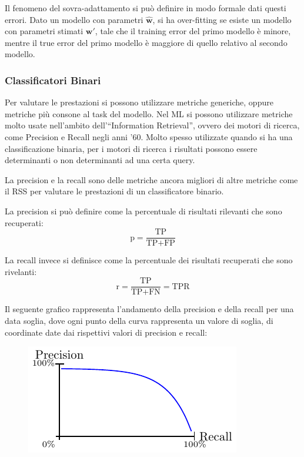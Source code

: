 \documentclass{article}
\numberwithin{equation}{subsection}
\newcommand{\vect}[1]{\boldsymbol{\mathbf{#1}}}
\begin{document}
Il fenomeno del sovra-adattamento si può definire in modo formale dati questi errori. 
Dato un modello con parametri $\vect{\hat{w}}$, si ha over-fitting se esiste un modello con 
parametri stimati $\vect{w}'$, tale che il training error del primo modello è 
minore, mentre il true error del primo modello è maggiore di quello relativo al secondo 
modello. 

\subsubsection{Classificatori Binari}

Per valutare le prestazioni si possono utilizzare metriche generiche, oppure metriche più 
consone al task del modello. Nel ML si possono utilizzare metriche molto usate nell'ambito dell'``Information Retrieval'', ovvero dei motori di ricerca, come Precision e Recall negli anni '60. 
Molto spesso utilizzate quando si ha una classificazione binaria, per i motori di ricerca i risultati possono essere determinanti o non determinanti ad una certa query. 

La precision e la recall sono delle metriche ancora migliori di altre metriche come il RSS per valutare le prestazioni di un classificatore binario. 

La precision si può definire come la percentuale di risultati rilevanti che sono 
recuperati:
\begin{equation}
    \text{p}=\displaystyle\frac{\text{TP}}{\text{TP}+\text{FP}}
\end{equation}

La recall invece si definisce come la percentuale dei risultati recuperati che sono 
rivelanti:
\begin{equation}
    \text{r}=\displaystyle\frac{\text{TP}}{\text{TP}+\text{FN}}=\text{TPR}
\end{equation}

Il seguente grafico rappresenta l'andamento della precision e della recall per una data soglia, dove ogni punto della curva rappresenta un valore di soglia, di coordinate date dai rispettivi valori di precision e recall:
\begin{figure}[H]%
    \centering%
    \includegraphics{precision_recall.pdf}%
\end{figure}
\end{document}
